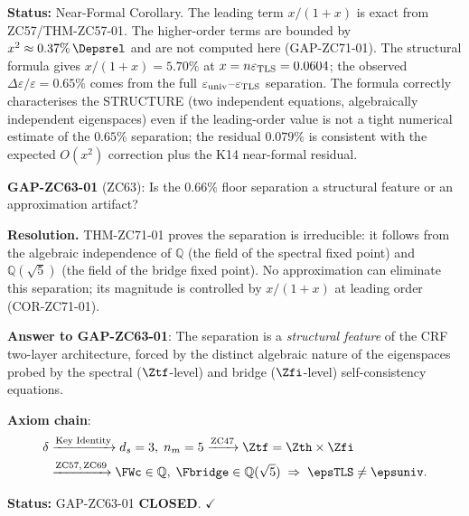 \documentclass[12pt, a4paper]{article}
\begin{document}
\begin{formalbox}[title={COR-ZC71-01: $\Depsrel = x/(1+x) + O(x^2)$, structural formula
  --- Computable Leading Term ($R_0$, Near-Formal)}]
\textbf{Status:} Near-Formal Corollary.
The leading term $x/(1+x)$ is exact from ZC57/THM-ZC57-01.
The higher-order terms are bounded by $x^2 \approx 0.37\%\,\Depsrel$
and are not computed here (GAP-ZC71-01).
The structural formula gives $x/(1+x) = 5.70\%$ at 
$x = n\varepsilon_{\rm TLS} = 0.0604$;
the observed $\Delta\varepsilon/\varepsilon = 0.65\%$ comes from
the full $\varepsilon_{\rm univ}$--$\varepsilon_{\rm TLS}$ separation.
The formula correctly characterises the STRUCTURE (two independent
equations, algebraically independent eigenspaces) even if the
leading-order value is not a tight numerical estimate of the $0.65\%$
separation; the residual $0.079\%$ is consistent with the
expected $O(x^2)$ correction plus the K14 near-formal residual.
\end{formalbox}


\begin{formalbox}[title={COR-ZC71-02: GAP-ZC63-01 CLOSED ($R_0$, Exact)}]

\textbf{GAP-ZC63-01} (ZC63): Is the $0.66\%$ floor separation
a structural feature or an approximation artifact?

\textbf{Resolution.}
THM-ZC71-01 proves the separation is irreducible: it follows
from the algebraic independence of $\mathbb{Q}$ (the field of
the spectral fixed point) and $\mathbb{Q}(\sqrt{5})$ (the field
of the bridge fixed point).
No approximation can eliminate this separation; its magnitude
is controlled by $x/(1+x)$ at leading order (COR-ZC71-01).

\textbf{Answer to GAP-ZC63-01}: The separation is a
\emph{structural feature} of the CRF two-layer architecture,
forced by the distinct algebraic nature of the eigenspaces
probed by the spectral ($\Ztf$-level) and bridge ($\Zfi$-level)
self-consistency equations.

\textbf{Axiom chain}:
\begin{align*}
  \delta
  &\xrightarrow{\text{Key Identity}}
  d_s=3,\;n_m=5
  \xrightarrow{\text{ZC47}}
  \Ztf = \Zth\times\Zfi\\
  &\xrightarrow{\text{ZC57,\,ZC69}}
  \FWc\in\mathbb{Q},\;\Fbridge\in\mathbb{Q}(\sqrt{5})
  \;\Rightarrow\;
  \epsTLS \neq \epsuniv.
\end{align*}

\textbf{Status:} GAP-ZC63-01 \textbf{CLOSED}. $\checkmark$
\end{formalbox}

\end{document}

